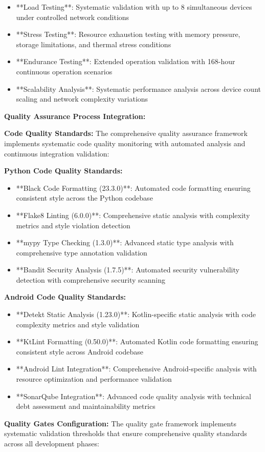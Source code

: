 \documentclass[12pt,a4paper]{report}
\begin{document}
\begin{itemize}
\item **Load Testing**: Systematic validation with up to 8 simultaneous devices under controlled network conditions
\item **Stress Testing**: Resource exhaustion testing with memory pressure, storage limitations, and thermal stress
  conditions
\item **Endurance Testing**: Extended operation validation with 168-hour continuous operation scenarios
\item **Scalability Analysis**: Systematic performance analysis across device count scaling and network complexity
  variations

\end{itemize}
\textbf{Quality Assurance Process Integration:}

\textbf{Code Quality Standards:}
The comprehensive quality assurance framework implements systematic code quality monitoring with automated analysis and
continuous integration validation:

\textbf{Python Code Quality Standards:}

\begin{itemize}
\item **Black Code Formatting (23.3.0)**: Automated code formatting ensuring consistent style across the Python codebase
\item **Flake8 Linting (6.0.0)**: Comprehensive static analysis with complexity metrics and style violation detection
\item **mypy Type Checking (1.3.0)**: Advanced static type analysis with comprehensive type annotation validation
\item **Bandit Security Analysis (1.7.5)**: Automated security vulnerability detection with comprehensive security scanning

\end{itemize}
\textbf{Android Code Quality Standards:}

\begin{itemize}
\item **Detekt Static Analysis (1.23.0)**: Kotlin-specific static analysis with code complexity metrics and style validation
\item **KtLint Formatting (0.50.0)**: Automated Kotlin code formatting ensuring consistent style across Android codebase
\item **Android Lint Integration**: Comprehensive Android-specific analysis with resource optimization and performance
  validation
\item **SonarQube Integration**: Advanced code quality analysis with technical debt assessment and maintainability metrics

\end{itemize}
\textbf{Quality Gates Configuration:}
The quality gate framework implements systematic validation thresholds that ensure comprehensive quality standards
across all development phases:
\end{document}
